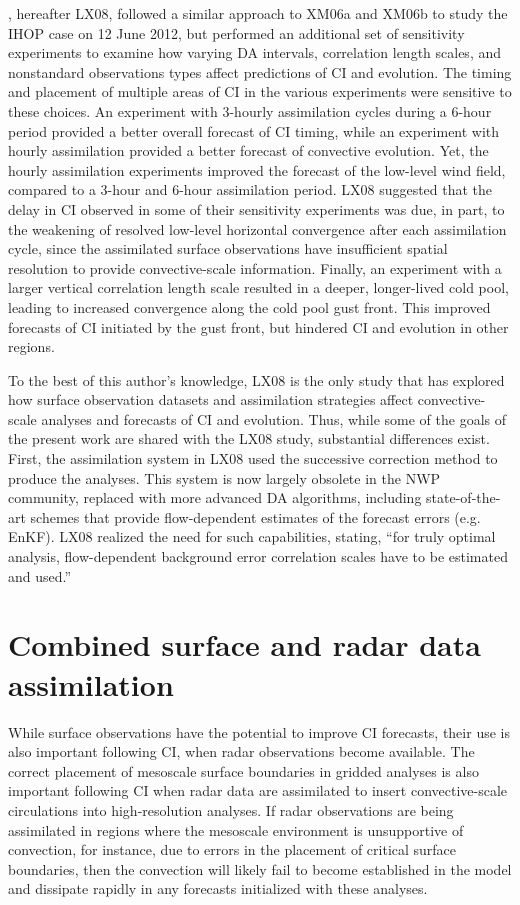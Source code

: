 \citet{liuxue08}, hereafter LX08, followed a similar approach to XM06a and XM06b to study the IHOP case on 12 June 2012, but performed an additional set of sensitivity experiments to examine how varying DA intervals, correlation length scales, and nonstandard observations types affect predictions of CI and evolution. The timing and placement of multiple areas of CI in the various experiments were sensitive to these choices. An experiment with 3-hourly assimilation cycles during a 6-hour period provided a better overall forecast of CI timing, while an experiment with hourly assimilation provided a better forecast of convective evolution. Yet, the hourly assimilation experiments improved the forecast of the low-level wind field, compared to a 3-hour and 6-hour assimilation period. LX08 suggested that the delay in CI observed in some of their sensitivity experiments was due, in part, to the weakening of resolved low-level horizontal convergence after each assimilation cycle, since the assimilated surface observations have insufficient spatial resolution to provide convective-scale information. Finally, an experiment with a larger vertical correlation length scale resulted in a deeper, longer-lived cold pool, leading to increased convergence along the cold pool gust front. This improved forecasts of CI initiated by the gust front, but hindered CI and evolution in other regions. 

To the best of this author’s knowledge, LX08 is the only study that has explored how surface observation datasets and assimilation strategies affect convective-scale analyses and forecasts of CI and evolution. Thus, while some of the goals of the present work are shared with the LX08 study, substantial differences exist. First, the assimilation system in LX08 used the \citet{bratseth86} successive correction method to produce the analyses. This system is now largely obsolete in the NWP community, replaced with more advanced DA algorithms, including state-of-the-art schemes that provide flow-dependent estimates of the forecast errors (e.g. EnKF). LX08 realized the need for such capabilities, stating, “for truly optimal analysis, flow-dependent background error correlation scales have to be estimated and used.” 

\section{Combined surface and radar data assimilation}
While surface observations have the potential to improve CI forecasts, their use is also important following CI, when radar observations become available. The correct placement of mesoscale surface boundaries in gridded analyses is also important following CI when radar data are assimilated to insert convective-scale circulations into high-resolution analyses. If radar observations are being assimilated in regions where the mesoscale environment is unsupportive of convection, for instance, due to errors in the placement of critical surface boundaries, then the convection will likely fail to become established in the model and dissipate rapidly in any forecasts initialized with these analyses.

